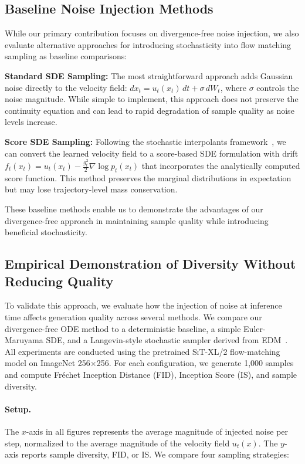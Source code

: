 \documentclass{article}
\begin{document}
\subsection{Baseline Noise Injection Methods}

While our primary contribution focuses on divergence-free noise injection, we also evaluate alternative approaches for introducing stochasticity into flow matching sampling as baseline comparisons:

\textbf{Standard SDE Sampling:} The most straightforward approach adds Gaussian noise directly to the velocity field: $dx_t = u_t(x_t)\,dt + \sigma\,dW_t$, where $\sigma$ controls the noise magnitude. While simple to implement, this approach does not preserve the continuity equation and can lead to rapid degradation of sample quality as noise levels increase.

\textbf{Score SDE Sampling:} Following the stochastic interpolants framework~\cite{ma2024sit}, we can convert the learned velocity field to a score-based SDE formulation with drift $f_t(x_t) = u_t(x_t) - \frac{g_t^2}{2} \nabla \log p_t(x_t)$ that incorporates the analytically computed score function. This method preserves the marginal distributions in expectation but may lose trajectory-level mass conservation.

These baseline methods enable us to demonstrate the advantages of our divergence-free approach in maintaining sample quality while introducing beneficial stochasticity.

\subsection{Empirical Demonstration of Diversity Without Reducing Quality}
\label{sec:noise_study}

To validate this approach, we evaluate how the injection of noise at inference time affects generation quality across several methods. We compare our divergence-free ODE method to a deterministic baseline, a simple Euler-Maruyama SDE, and a Langevin-style stochastic sampler derived from EDM~\cite{karras2022elucidatingdesignspacediffusionbased}. All experiments are conducted using the pretrained \textsc{SiT-XL/2} flow-matching model on ImageNet 256×256. For each configuration, we generate 1,000 samples and compute Fréchet Inception Distance (FID), Inception Score (IS), and sample diversity.

\paragraph{Setup.}
The $x$-axis in all figures represents the average magnitude of injected noise per step, normalized to the average magnitude of the velocity field \( u_t(x) \). The $y$-axis reports sample diversity, FID, or IS. We compare four sampling strategies:
\end{document}
